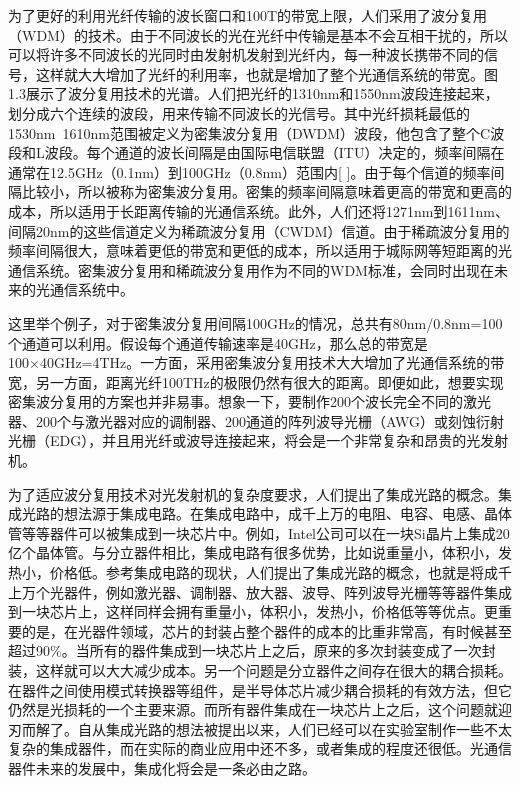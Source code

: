 \documentclass[oneside]{ZJUthesis}
\begin{document}
为了更好的利用光纤传输的波长窗口和100T的带宽上限，人们采用了波分复用（WDM）的技术。由于不同波长的光在光纤中传输是基本不会互相干扰的，所以可以将许多不同波长的光同时由发射机发射到光纤内，每一种波长携带不同的信号，这样就大大增加了光纤的利用率，也就是增加了整个光通信系统的带宽。图 1.3展示了波分复用技术的光谱。人们把光纤的1310nm和1550nm波段连接起来，划分成六个连续的波段，用来传输不同波长的光信号。其中光纤损耗最低的1530nm~1610nm范围被定义为密集波分复用（DWDM）波段，他包含了整个C波段和L波段。每个通道的波长间隔是由国际电信联盟（ITU）决定的，频率间隔在通常在12.5GHz（0.1nm）到100GHz（0.8nm）范围内[ ]。由于每个信道的频率间隔比较小，所以被称为密集波分复用。密集的频率间隔意味着更高的带宽和更高的成本，所以适用于长距离传输的光通信系统。此外，人们还将1271nm到1611nm、间隔20nm的这些信道定义为稀疏波分复用（CWDM）信道。由于稀疏波分复用的频率间隔很大，意味着更低的带宽和更低的成本，所以适用于城际网等短距离的光通信系统。密集波分复用和稀疏波分复用作为不同的WDM标准，会同时出现在未来的光通信系统中。

这里举个例子，对于密集波分复用间隔100GHz的情况，总共有80nm/0.8nm=100个通道可以利用。假设每个通道传输速率是40GHz，那么总的带宽是100×40GHz=4THz。一方面，采用密集波分复用技术大大增加了光通信系统的带宽，另一方面，距离光纤100THz的极限仍然有很大的距离。即便如此，想要实现密集波分复用的方案也并非易事。想象一下，要制作200个波长完全不同的激光器、200个与激光器对应的调制器、200通道的阵列波导光栅（AWG）或刻蚀衍射光栅（EDG），并且用光纤或波导连接起来，将会是一个非常复杂和昂贵的光发射机。

为了适应波分复用技术对光发射机的复杂度要求，人们提出了集成光路的概念。集成光路的想法源于集成电路。在集成电路中，成千上万的电阻、电容、电感、晶体管等等器件可以被集成到一块芯片中。例如，Intel公司可以在一块Si晶片上集成20亿个晶体管。与分立器件相比，集成电路有很多优势，比如说重量小，体积小，发热小，价格低。参考集成电路的现状，人们提出了集成光路的概念，也就是将成千上万个光器件，例如激光器、调制器、放大器、波导、阵列波导光栅等等器件集成到一块芯片上，这样同样会拥有重量小，体积小，发热小，价格低等等优点。更重要的是，在光器件领域，芯片的封装占整个器件的成本的比重非常高，有时候甚至超过90\%。当所有的器件集成到一块芯片上之后，原来的多次封装变成了一次封装，这样就可以大大减少成本。另一个问题是分立器件之间存在很大的耦合损耗。在器件之间使用模式转换器等组件，是半导体芯片减少耦合损耗的有效方法，但它仍然是光损耗的一个主要来源。而所有器件集成在一块芯片上之后，这个问题就迎刃而解了。自从集成光路的想法被提出以来，人们已经可以在实验室制作一些不太复杂的集成器件，而在实际的商业应用中还不多，或者集成的程度还很低。光通信器件未来的发展中，集成化将会是一条必由之路。
\end{document}

